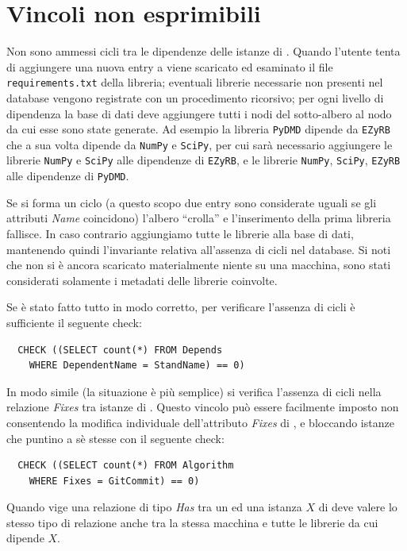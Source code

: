 \documentclass{article}
\begin{document}
\section{Vincoli non esprimibili}
Non sono ammessi cicli tra le dipendenze delle istanze di . Quando l'utente tenta di aggiungere una nuova entry a  viene scaricato ed esaminato il file \texttt{requirements.txt} della libreria; eventuali librerie necessarie non presenti nel database vengono registrate con un procedimento ricorsivo; per ogni livello di dipendenza la base di dati deve aggiungere tutti i nodi del sotto-albero al nodo da cui esse sono state generate. Ad esempio la libreria \texttt{PyDMD} dipende da \texttt{EZyRB} che a sua volta dipende da \texttt{NumPy} e \texttt{SciPy}, per cui sarà necessario aggiungere le librerie \texttt{NumPy} e \texttt{SciPy} alle dipendenze di \texttt{EZyRB}, e le librerie \texttt{NumPy}, \texttt{SciPy}, \texttt{EZyRB} alle dipendenze di \texttt{PyDMD}.

Se si forma un ciclo (a questo scopo due entry sono considerate uguali se gli attributi \emph{Name} coincidono) l'albero ``crolla'' e l'inserimento della prima libreria fallisce. In caso contrario aggiungiamo tutte le librerie alla base di dati, mantenendo quindi l'invariante relativa all'assenza di cicli nel database. Si noti che non si è ancora scaricato materialmente niente su una macchina, sono stati considerati solamente i metadati delle librerie coinvolte.

Se è stato fatto tutto in modo corretto, per verificare l'assenza di cicli è sufficiente il seguente check:

\begin{verbatim}
  CHECK ((SELECT count(*) FROM Depends
    WHERE DependentName = StandName) == 0)
\end{verbatim}

In modo simile (la situazione è più semplice) si verifica l'assenza di cicli nella relazione \emph{Fixes} tra istanze di . Questo vincolo può essere facilmente imposto non consentendo la modifica individuale dell'attributo \emph{Fixes} di , e bloccando istanze che puntino a sè stesse con il seguente check:

\begin{verbatim}
  CHECK ((SELECT count(*) FROM Algorithm
    WHERE Fixes = GitCommit) == 0)
\end{verbatim}

Quando vige una relazione di tipo \emph{Has} tra un  ed una istanza $X$ di  deve valere lo stesso tipo di relazione anche tra la stessa macchina e tutte le librerie da cui dipende $X$.
\end{document}
